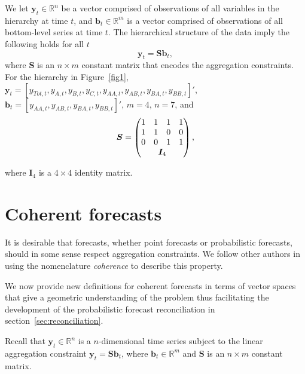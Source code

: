 \documentclass[a4paper, 11pt]{article}
\theoremstyle{theo}
\theoremstyle{definition}
\begin{document}
We let $\bm{y}_t \in \mathbb{R}^n$ be a vector comprised of observations of all variables in the hierarchy at time $t$,  and $\bm{b}_t \in \mathbb{R}^m$ is a vector comprised of observations of all bottom-level series at time $t$. The hierarchical structure of the data imply the following holds for all $t$
\begin{equation}
  \bm{y}_t = \bm{Sb}_t,
\end{equation}
where $\bm{S}$ is an $n \times m$ constant matrix that encodes the aggregation constraints.  For the hierarchy in Figure~\ref{fig1}, $\bm{y}_t = [y_{Tot,t},y_{A,t}, y_{B,t},y_{C,t},y_{AA,t}, y_{AB,t}, y_{BA,t}, y_{BB,t}]'$, $\bm{b}_t = [y_{AA,t}, y_{AB,t}, y_{BA,t}, y_{BB,t}]'$, $m=4$, $n=7$, and 
$$ 
  \bm{S} = \begin{pmatrix} 
               1& 1 &1 &1  \\ 
               1 &1 & 0 &0 \\   
               0&0  & 1 & 1 \\ 
               & \multicolumn{2}{c}{\bm{I}_4} &   
           \end{pmatrix}, 
$$ 

where $\bm{I}_4$ is a $4\times 4$ identity matrix.  

\section{Coherent forecasts}\label{sec:definitions}

It is desirable that forecasts, whether point forecasts or probabilistic forecasts, should in some sense respect aggregation constraints.  We follow other authors \cite{Wickramasuriya2017} in using the nomenclature {\em coherence} to describe this property.   

We now provide new definitions for coherent forecasts in terms of vector spaces that give a geometric understanding of the problem thus facilitating the development of the probabilistic forecast reconciliation in section~\ref{sec:reconciliation}. 

Recall that $\bm{y}_t \in \mathbb{R}^n$ is a $n$-dimensional time series subject to the linear aggregation constraint $\bm{y}_t = \bm{S}\bm{b}_t$, where $\bm{b}_t \in \mathbb{R}^m$ and $\bm{S}$ is an $n \times m$ constant matrix.
\end{document}
